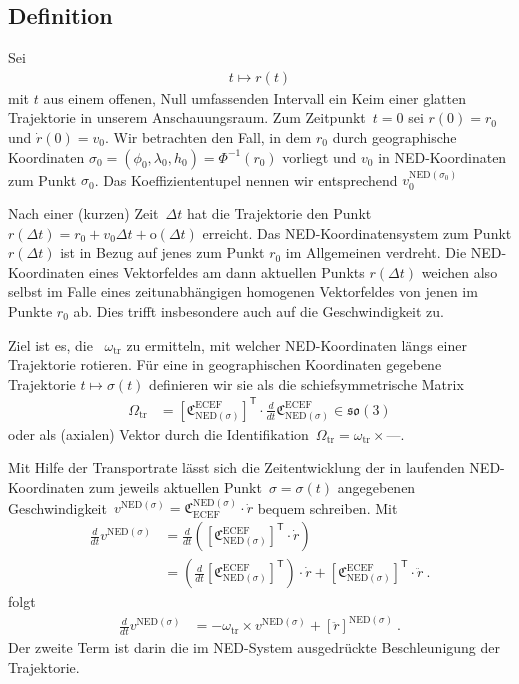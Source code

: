 \documentclass[10pt,a4paper]{article}
\newcommand{\mydef}[1]{\textls{#1}}
\newcommand{\nul}{\textrm{---}}
\newcommand{\trans}{^\mathsf{T}}
\begin{document}
\subsection{Definition}

Sei
\begin{align}
	t \mapsto r(t)
\end{align}
mit $t$ aus einem offenen, Null umfassenden Intervall ein Keim einer glatten Trajektorie in unserem Anschauungsraum.
Zum Zeitpunkt~$t=0$ sei $r(0)=r_0$ und $\dot{r}(0)=v_0$.
Wir betrachten den Fall, in dem $r_0$ durch geographische Koordinaten $\sigma_0=(\phi_0, \lambda_0, h_0)=\Phi^{-1}(r_0)$ vorliegt und $v_0$ in NED-Koordinaten zum Punkt $\sigma_0$. 
Das Koeffiziententupel nennen wir entsprechend $v_0^{\mathrm{NED}(\sigma_0)}$

Nach einer (kurzen) Zeit~$\Delta t$ hat die Trajektorie den Punkt $r(\Delta t) = r_0 + v_0\Delta t + \mathrm{o}(\Delta t)$ erreicht.
Das NED-Koordinatensystem zum Punkt $r(\Delta t)$ ist in Bezug auf jenes zum Punkt $r_0$ im Allgemeinen verdreht.
Die NED-Koordinaten eines Vektorfeldes am dann aktuellen Punkts $r(\Delta t)$ weichen also selbst im Falle eines zeitunabhängigen homogenen Vektorfeldes von jenen im Punkte $r_0$ ab.
Dies trifft insbesondere auch auf die Geschwindigkeit zu.

Ziel ist es, die \mydef{Transportrate}~$\omega_{\mathrm{tr}}$ zu ermitteln, mit welcher NED-Koordinaten längs einer Trajektorie rotieren.
Für eine in geographischen Koordinaten gegebene Trajektorie $t \mapsto \sigma(t)$ definieren wir sie als die schiefsymmetrische Matrix
\begin{align}
\label{eq:omega_tr_def}
	\Omega_{\mathrm{tr}}
	&=
	\left[
	\mathfrak{C}^{\mathrm{ECEF}}_{\mathrm{NED}(\sigma)}
	\right]\trans
	\cdot
	\frac{d}{dt}
	\mathfrak{C}^{\mathrm{ECEF}}_{\mathrm{NED}(\sigma)}
	\in\mathfrak{so}(3)
\end{align}
oder als (axialen) Vektor durch die Identifikation~$\Omega_{\mathrm{tr}}=\omega_{\mathrm{tr}}\times\nul$.

Mit Hilfe der Transportrate lässt sich die Zeitentwicklung der in laufenden NED-Koordinaten zum jeweils aktuellen Punkt~$\sigma=\sigma(t)$ angegebenen Geschwindigkeit~$v^{\mathrm{NED}(\sigma)}=\mathfrak{C}_{\mathrm{ECEF}}^{\mathrm{NED}(\sigma)}\cdot \dot{r}$ bequem schreiben.
Mit
\begin{align}
	\frac{d}{dt}
	v^{\mathrm{NED}(\sigma)}
	&=
	\frac{d}{dt}
	\left(
	\left[
		\mathfrak{C}^{\mathrm{ECEF}}_{\mathrm{NED}(\sigma)}
	\right]\trans
	\cdot
	\dot{r}
	\right)
	\nonumber\\
	&=
	\left(
	\frac{d}{dt}
	\left[
		\mathfrak{C}^{\mathrm{ECEF}}_{\mathrm{NED}(\sigma)}
	\right]\trans
	\right)
	\cdot
	\dot{r}
	+
	\left[
		\mathfrak{C}^{\mathrm{ECEF}}_{\mathrm{NED}(\sigma)}
	\right]\trans
	\cdot
	\ddot{r}		
	\ .		
\end{align}
folgt
\begin{align}
	\frac{d}{dt}
	v^{\mathrm{NED}(\sigma)}
	&=
	-\omega_{\mathrm{tr}}
	\times
	v^{\mathrm{NED}(\sigma)}
	+ \left[
		\ddot{r}
	\right]^{\mathrm{NED}(\sigma)}
	\ .	
\end{align}
Der zweite Term ist darin die im NED-System ausgedrückte Beschleunigung der Trajektorie.
\end{document}
